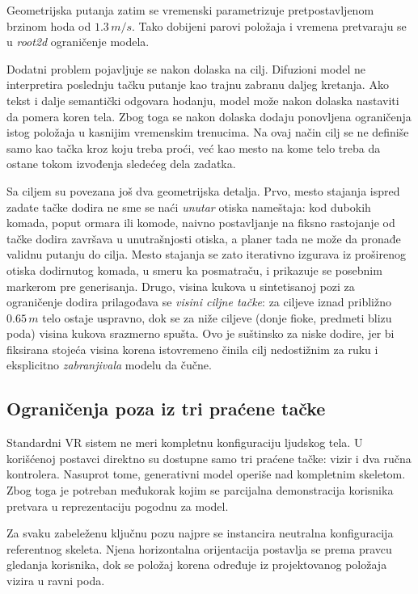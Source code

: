 \documentclass{article}
\begin{document}
Geometrijska putanja zatim se vremenski parametrizuje pretpostavljenom brzinom hoda od $1.3\,m/s$. Tako dobijeni parovi položaja i vremena pretvaraju se u \textit{root2d} ograničenje modela.

Dodatni problem pojavljuje se nakon dolaska na cilj. Difuzioni model ne interpretira poslednju tačku putanje kao trajnu zabranu daljeg kretanja. Ako tekst i dalje semantički odgovara hodanju, model može nakon dolaska nastaviti da pomera koren tela. Zbog toga se nakon dolaska dodaju ponovljena ograničenja istog položaja u kasnijim vremenskim trenucima. Na ovaj način cilj se ne definiše samo kao tačka kroz koju treba proći, već kao mesto na kome telo treba da ostane tokom izvođenja sledećeg dela zadatka.

Sa ciljem su povezana još dva geometrijska detalja. Prvo, mesto stajanja ispred zadate tačke dodira ne sme se naći \emph{unutar} otiska nameštaja: kod dubokih komada, poput ormara ili komode, naivno postavljanje na fiksno rastojanje od tačke dodira završava u unutrašnjosti otiska, a planer tada ne može da pronađe validnu putanju do cilja. Mesto stajanja se zato iterativno izgurava iz proširenog otiska dodirnutog komada, u smeru ka posmatraču, i prikazuje se posebnim markerom pre generisanja. Drugo, visina kukova u sintetisanoj pozi za ograničenje dodira prilagođava se \emph{visini ciljne tačke}: za ciljeve iznad približno $0.65\,m$ telo ostaje uspravno, dok se za niže ciljeve (donje fioke, predmeti blizu poda) visina kukova srazmerno spušta. Ovo je suštinsko za niske dodire, jer bi fiksirana stojeća visina korena istovremeno činila cilj nedostižnim za ruku i eksplicitno \emph{zabranjivala} modelu da čučne.

\subsection{Ograničenja poza iz tri praćene tačke}
\label{sec:poses}

Standardni VR sistem ne meri kompletnu konfiguraciju ljudskog tela. U korišćenoj postavci direktno su dostupne samo tri praćene tačke: vizir i dva ručna kontrolera. Nasuprot tome, generativni model operiše nad kompletnim skeletom. Zbog toga je potreban međukorak kojim se parcijalna demonstracija korisnika pretvara u reprezentaciju pogodnu za model.

Za svaku zabeleženu ključnu pozu najpre se instancira neutralna konfiguracija referentnog skeleta. Njena horizontalna orijentacija postavlja se prema pravcu gledanja korisnika, dok se položaj korena određuje iz projektovanog položaja vizira u ravni poda.
\end{document}
